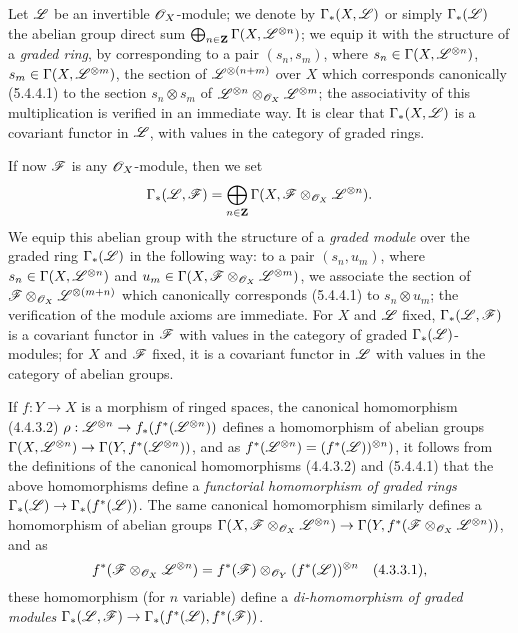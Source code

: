 \begin{env}[5.4.6]
\label{0.5.4.6}
Let $\mathscr{L}$ be an invertible $\mathscr{O}_X$-module; we denote by $\Gamma_*(X,\mathscr{L})$ or simply $\Gamma_*(\mathscr{L})$ the abelian group direct sum $\bigoplus_{n\in\mathbf{Z}}\Gamma(X,\mathscr{L}^{\otimes n})$;
we equip it with the structure of a \emph{graded ring}, by corresponding to a pair $(s_n,s_m)$, where $s_n\in\Gamma(X,\mathscr{L}^{\otimes n})$, $s_m\in\Gamma(X,\mathscr{L}^{\otimes m})$, the section of $\mathscr{L}^{\otimes(n+m)}$ over $X$ which corresponds canonically (5.4.4.1) to the section $s_n\otimes s_m$ of $\mathscr{L}^{\otimes n}\otimes_{\mathscr{O}_X}\mathscr{L}^{\otimes m}$;
the associativity of this multiplication is verified in an immediate way.
It is clear that $\Gamma_*(X,\mathscr{L})$ is a covariant functor in $\mathscr{L}$, with values in the category of graded rings.

If now $\mathscr{F}$ is any $\mathscr{O}_X$-module, then we set
\[
  \Gamma_*(\mathscr{L},\mathscr{F})=\bigoplus_{n\in\mathbf{Z}}\Gamma(X,\mathscr{F}\otimes_{\mathscr{O}_X}\mathscr{L}^{\otimes n}).
\]
We equip this abelian group with the structure of a \emph{graded module} over the graded ring $\Gamma_*(\mathscr{L})$ in the following way:
to a pair $(s_n,u_m)$, where $s_n\in\Gamma(X,\mathscr{L}^{\otimes n})$ and $u_m\in\Gamma(X,\mathscr{F}\otimes_{\mathscr{O}_X}\mathscr{L}^{\otimes m})$, we associate the section of $\mathscr{F}\otimes_{\mathscr{O}_X}\mathscr{L}^{\otimes(m+n)}$ which canonically corresponds (5.4.4.1) to $s_n\otimes u_m$;
the verification of the module axioms are immediate.
For $X$ and $\mathscr{L}$ fixed, $\Gamma_*(\mathscr{L},\mathscr{F})$ is a covariant functor in $\mathscr{F}$ with values in the category of graded $\Gamma_*(\mathscr{L})$-modules;
for $X$ and $\mathscr{F}$ fixed, it is a covariant functor in $\mathscr{L}$ with values in the category of abelian groups.

If $f:Y\to X$ is a morphism of ringed spaces, the canonical homomorphism (4.4.3.2) $\rho:\sh{L}^{\otimes n}\to f_*(f^*(\sh{L}^{\otimes n}))$ defines a homomorphism of abelian groups $\Gamma(X,\sh{L}^{\otimes n})\to\Gamma(Y,f^*(\sh{L}^{\otimes n}))$, and as $f^*(\mathscr{L}^{\otimes n})=(f^*(\mathscr{L}))^{\otimes n})$, it follows from the definitions of the canonical homomorphisms (4.4.3.2) and (5.4.4.1) that the above homomorphisms define a \emph{functorial homomorphism of graded rings $\Gamma_*(\sh{L})\to\Gamma_*(f^*(\sh{L}))$}.
The same canonical homomorphism  similarly defines a homomorphism of abelian groups $\Gamma(X,\sh{F}\otimes_{\OO_X}\sh{L}^{\otimes n})\to\Gamma(Y,f^*(\sh{F}\otimes_{\OO_X}\sh{L}^{\otimes n}))$, and as
\[
  f^*(\mathscr{F}\otimes_{\mathscr{O}_X}\mathscr{L}^{\otimes n})=f^*(\mathscr{F})\otimes_{\mathscr{O}_Y}(f^*(\mathscr{L}))^{\otimes n}
  \quad(4.3.3.1),
\]
these homomorphism (for $n$ variable) define a \emph{di-homomorphism of graded modules $\Gamma_*(\sh{L},\sh{F})\to\Gamma_*(f^*(\sh{L}),f^*(\sh{F}))$}.
\end{env}

